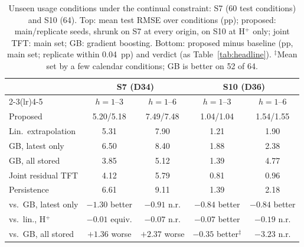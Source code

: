 \begin{table}[t]
  \centering
  \caption{Unseen usage conditions under the continual constraint: S7 (60 test conditions) and S10
    (64). Top: mean test RMSE over conditions (pp); proposed: main/replicate seeds, shrunk on S7 at every
    origin, on S10 at H$^+$ only; joint TFT: main set; GB: gradient boosting. Bottom: proposed minus baseline (pp,
    main set; replicate within 0.04~pp) and verdict (as Table~\ref{tab:headline}). $^\ddagger$Mean set by
    a few calendar conditions; GB is better on 52 of 64.}
  \label{tab:many}
  \setlength{\tabcolsep}{2pt}
  \scriptsize
  \begin{tabular}{lcccc}
    \toprule
    & \multicolumn{2}{c}{S7 (D34)} & \multicolumn{2}{c}{S10 (D36)} \\
    \cmidrule(lr){2-3}\cmidrule(lr){4-5}
    & $h{=}1$--3 & $h{=}1$--6 & $h{=}1$--3 & $h{=}1$--6 \\
    \midrule
    Proposed & 5.20/5.18 & 7.49/7.48 & 1.04/1.04 & 1.54/1.55 \\
    Lin.\ extrapolation & 5.31 & 7.90 & 1.21 & 1.90 \\
    GB, latest only & 6.50 & 8.40 & 1.88 & 2.38 \\
    GB, all stored & 3.85 & 5.12 & 1.39 & 4.77 \\
    Joint residual TFT & 4.12 & 5.79 & 0.81 & 0.96 \\
    Persistence & 6.61 & 9.11 & 1.39 & 2.18 \\
    \midrule
    vs.\ GB, latest only & $-1.30$ better & $-0.91$ n.r. & $-0.84$ better & $-0.84$ better \\
    vs.\ lin., H$^+$ & $-0.01$ equiv. & $-0.07$ n.r. & $-0.07$ better & $-0.19$ n.r. \\
    vs.\ GB, all stored & $+1.36$ worse & $+2.37$ worse & $-0.35$ better$^\ddagger$ & $-3.23$ n.r. \\
    \bottomrule
  \end{tabular}
\end{table}
